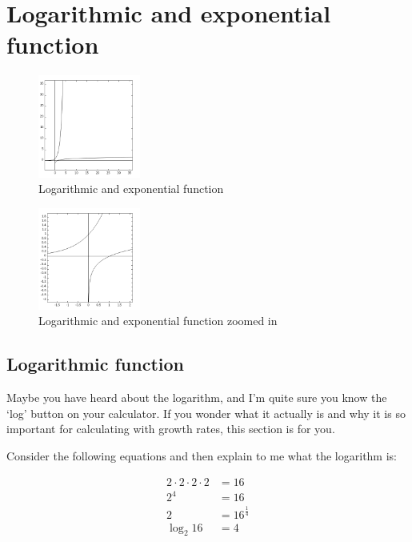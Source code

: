 \documentclass[
  12pt,
  oneside]{book}
\theoremstyle{definition}
\theoremstyle{definition}
\theoremstyle{definition}
\theoremstyle{definition}
\theoremstyle{remark}
\begin{document}
\section{Logarithmic and exponential function}\label{logarithmic-and-exponential-function}

\begin{figure}
\centering
\includegraphics[width=0.3\textwidth,height=\textheight]{fig/logexp1.png}
\caption{\label{fig:logexp1} Logarithmic and exponential function}
\end{figure}

\begin{figure}
\centering
\includegraphics[width=0.3\textwidth,height=\textheight]{fig/logexp2.png}
\caption{\label{fig:logexp2} Logarithmic and exponential function zoomed in}
\end{figure}

\subsection{Logarithmic function}\label{logarithmic-function}

Maybe you have heard about the logarithm, and I'm quite sure you know the `log' button on your calculator. If you wonder what it actually is and why it is so important for calculating with growth rates, this section is for you.

Consider the following equations and then explain to me what the logarithm is:

\begin{align*}
2\cdot2\cdot2\cdot2 &= 16 \\
2^4 &= 16 \\
2 &= 16^{\frac{1}{4}} \\
\log_2 16 &= 4 
\end{align*}
\end{document}
